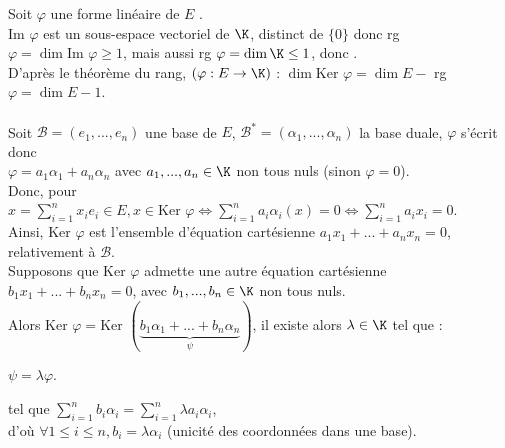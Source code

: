 \documentclass[12pt, a4paper]{report}
\begin{document}
\begin{remarque}{}
Soit $\varphi$ une forme linéaire de $E$ . \\
$\text{Im }\varphi$ est un sous-espace vectoriel de $\K$, distinct de $\{0\}$ donc rg $\varphi = \dim \text{Im }\varphi \ge 1$, mais aussi rg $\varphi = \dim \K \le 1$, donc . \\

D'après le théorème du rang, $(\varphi : E \to \K)$ : $\dim \text{Ker } \varphi = \dim E -$ rg $\varphi = \dim E - 1$. \\
 \\

Soit $\mathcal{B} = (e_1,...,e_n)$ une base de $E$, $\mathcal{B}^* = (\alpha_1,...,\alpha_n)$ la base duale, $\varphi$ s'écrit donc \\
$\varphi = a_1\alpha_1 + a_n \alpha_n$ avec $a_1,...,a_n \in \K$ non tous nuls (sinon $\varphi = 0$). \\

Donc, pour $x = \displaystyle{\sum_{i=1}^nx_ie_i} \in E, x \in \text{Ker }\varphi \Longleftrightarrow \displaystyle{\sum_{i=1}^na_i\alpha_i(x)} = 0 \Longleftrightarrow \displaystyle{\sum_{i=1}^n a_i x_i} = 0$. \\
Ainsi, $\text{Ker } \varphi$ est l'ensemble d'équation cartésienne $a_1x_1+...+a_nx_n = 0$, relativement à $\mathcal{B}$. \\

Supposons que $\text{Ker } \varphi$ admette une autre équation cartésienne $b_1x_1+...+b_nx_n = 0$, avec $b_1,...,b_n \in \K$ non tous nuls. \\
Alors $\text{Ker } \varphi = \text{Ker }(\underbrace{b_1\alpha_1+...+b_n\alpha_n}_\psi)$, il existe alors $\lambda \in \K$ tel que : 
\begin{center}
$\psi = \lambda \varphi$.
\end{center}
\ie tel que $\displaystyle{\sum_{i=1}^nb_i\alpha_i = \sum_{i=1}^n\lambda a_i\alpha_i}$, \\
d'où $\forall 1 \le i \le n, b_i = \lambda \alpha_i$ (unicité des coordonnées dans une base).

\end{remarque}
\end{document}
